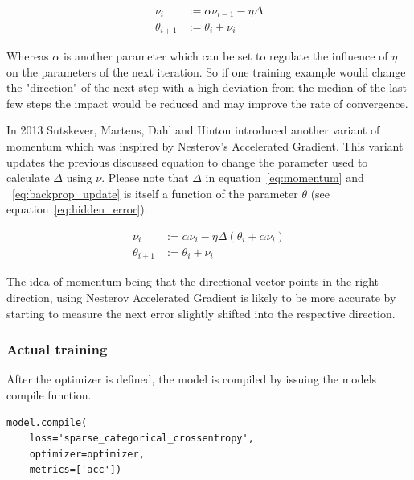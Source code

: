 \begin{equation}\label{eq:momentum}
    \begin{split}
        \nu_{i} &:= \alpha \nu_{i-1} - \eta \varDelta \\
        \theta_{i+1} &:= \theta_i + \nu_i
    \end{split}
\end{equation}

Whereas $\alpha$ is another parameter which can be set to regulate the influence of $\eta$ on the parameters of the next iteration.
So if one training example would change the "direction" of the next step with a high deviation from the median of the last few steps the impact would be reduced and may improve the rate of convergence.

In 2013 Sutskever, Martens, Dahl and Hinton\cite{Sutskever2013} introduced another variant of momentum which was inspired by Nesterov's Accelerated Gradient\cite{Nesterov1983}.
This variant updates the previous discussed equation to change the parameter used to calculate $\varDelta$ using $\nu$.
Please note that $\varDelta$ in equation~\eqref{eq:momentum} and ~\eqref{eq:backprop_update} is itself a function of the parameter $\theta$ (see equation~\eqref{eq:hidden_error}).

\begin{equation}\label{eq:nesterov}
    \begin{split}
    \nu_i & := \alpha \nu_i - \eta \varDelta(\theta_i + \alpha \nu_i) \\
    \theta_{i+1} & := \theta_i + \nu_i
    \end{split}
\end{equation}

The idea of momentum being that the directional vector points in the right direction, using Nesterov Accelerated Gradient is likely to be more accurate by starting to measure the next error slightly shifted into the respective direction\cite[p.353]{Geron2019}\cite[p.291]{Goodfellow2017}.

\subsubsection{Actual training}

After the optimizer is defined, the model is compiled by issuing the models compile function.

\begin{lstlisting}
model.compile(
    loss='sparse_categorical_crossentropy', 
    optimizer=optimizer,
    metrics=['acc'])
\end{lstlisting}

